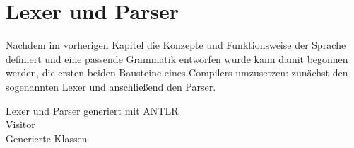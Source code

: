 \chapter{Lexer und Parser}
Nachdem im vorherigen Kapitel die Konzepte und Funktionsweise der Sprache definiert und eine passende Grammatik entworfen wurde kann damit begonnen werden, die ersten beiden Bausteine eines Compilers umzusetzen: zunächst den sogenannten Lexer und anschließend den Parser.







Lexer und Parser generiert mit ANTLR\\
Visitor\\
Generierte Klassen\\
